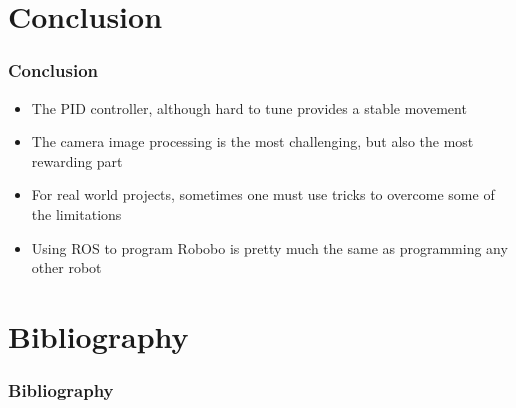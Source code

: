 \documentclass{beamer}
\begin{document}
\section{Conclusion}
\begin{frame}
\frametitle{Conclusion}
\begin{itemize}[<+->]
	\item The PID controller, although hard to tune provides a stable movement
	\item The camera image processing is the most challenging, but also the most rewarding part
    \item For real world projects, sometimes one must use tricks to overcome some of the limitations
    \item Using ROS to program Robobo is pretty much the same as programming any other robot
\end{itemize}
\end{frame}


\section{Bibliography}
\begin{frame}
\frametitle{Bibliography}
	{\scriptsize
		
		\nocite{*}
    	
    }
\end{frame}
\end{document}
